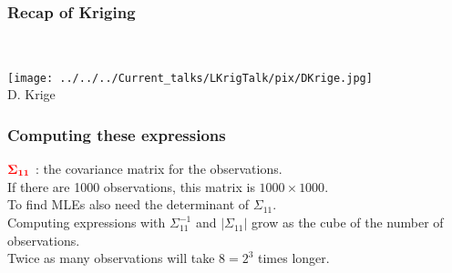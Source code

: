 \documentclass[english]{beamer} %
\def\Myspace{{\vspace*{.125in}}}
\begin{document}
\begin{frame} %
\frametitle{Recap of Kriging}
\begin{minipage}{3.5in}
\end{minipage}
\ 
\begin{minipage}{.75in}
\vspace*{0in}
\texttt{[image: ../../../Current\_talks/LKrigTalk/pix/DKrige.jpg]} \\
D. Krige
\end{minipage}

\end{frame} %

 \begin{frame} %
 \frametitle{Computing these expressions}
\bdot ${\color{red} \boldsymbol{\Sigma_{11} } }$ : 
the covariance matrix for the observations.  \\
If there are 1000 observations, this matrix is $1000 \times 1000$.  \\
\Myspace
\bdot To find MLEs also need the determinant of $\Sigma_{11}$.  \\
\Myspace
Computing expressions with {\color{red} $ \Sigma_{11}^{-1}$} and {\color{red} $ | \Sigma_{11}| $} grow as the cube of the number of observations. \\
\Myspace
\Myspace
 Twice as many observations will take  $8= 2^3 $ times longer. 
\end{frame} %
\end{document}
